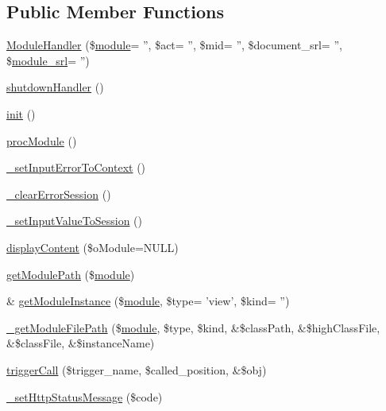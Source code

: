 \subsection*{Public Member Functions}
\begin{DoxyCompactItemize}
\item 
\hyperlink{classModuleHandler_abfb13533d16d60323823189ccca73237}{Module\-Handler} (\$\hyperlink{classmodule}{module}= '', \$act= '', \$mid= '', \$document\-\_\-srl= '', \$\hyperlink{ko_8install_8php_a370bb6450fab1da3e0ed9f484a38b761}{module\-\_\-srl}= '')
\item 
\hyperlink{classModuleHandler_a6295c502e315baa6c563f48ddf08e233}{shutdown\-Handler} ()
\item 
\hyperlink{classModuleHandler_a4a4671c196a893207c38af84c8ee7da8}{init} ()
\item 
\hyperlink{classModuleHandler_a74ad0ae3090eff1da5a6e0e68ce431d0}{proc\-Module} ()
\item 
\hyperlink{classModuleHandler_aa47d0ccb069d65698ade6f44bf6c705f}{\-\_\-set\-Input\-Error\-To\-Context} ()
\item 
\hyperlink{classModuleHandler_a45c91a72acccf3ee8139538ef5aa1c1d}{\-\_\-clear\-Error\-Session} ()
\item 
\hyperlink{classModuleHandler_ab3837506079a320e2726079777bb2b3e}{\-\_\-set\-Input\-Value\-To\-Session} ()
\item 
\hyperlink{classModuleHandler_a140c43faf30dedf139212294e3e9acf3}{display\-Content} (\$o\-Module=N\-U\-L\-L)
\item 
\hyperlink{classModuleHandler_a0a175bdc5034df0bf4ce66ea0e6e1bf2}{get\-Module\-Path} (\$\hyperlink{classmodule}{module})
\item 
\& \hyperlink{classModuleHandler_aea2e4d82f816ee25ec97ce2c830e6860}{get\-Module\-Instance} (\$\hyperlink{classmodule}{module}, \$type= 'view', \$kind= '')
\item 
\hyperlink{classModuleHandler_a75e1eb90149d7f6e38cfd5dc7a9521d4}{\-\_\-get\-Module\-File\-Path} (\$\hyperlink{classmodule}{module}, \$type, \$kind, \&\$class\-Path, \&\$high\-Class\-File, \&\$class\-File, \&\$instance\-Name)
\item 
\hyperlink{classModuleHandler_aa1b1f9eae91ccd76e6a81c9375c2e673}{trigger\-Call} (\$trigger\-\_\-name, \$called\-\_\-position, \&\$obj)
\item 
\hyperlink{classModuleHandler_a91c14051caea99153975f2335a2dc770}{\-\_\-set\-Http\-Status\-Message} (\$code)
\end{DoxyCompactItemize}
